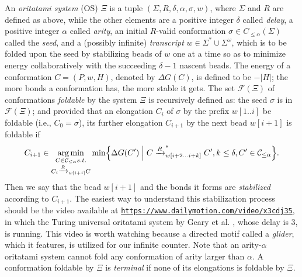 \documentclass[twocolumn]{svjour3}
\DeclareMathOperator*{\argmin}{arg\,min}
\begin{document}
An \textit{oritatami system} (OS) $\Xi$ is a tuple $(\Sigma, R, \delta, \alpha, \sigma, w)$, where $\Sigma$ and $R$ are defined as above, while the other elements are
a positive integer $\delta$ called \textit{delay}, 
a positive integer $\alpha$ called \textit{arity},
an initial $R$-valid conformation $\sigma \in C_{\le \alpha}(\Sigma)$ called the \textit{seed},
and a (possibly infinite) \textit{transcript} $w \in \Sigma^* \cup \Sigma^\omega$, which is to be folded upon the seed by stabilizing beads of $w$ one at a time so as to minimize energy collaboratively with the succeeding $\delta{-}1$ nascent beads.
%
The energy of a conformation $C = (P, w, H)$, denoted by $\Delta G(C)$, is defined to be ${-}|H|$; the more bonds a conformation has, the more stable it gets. 
The set $\mathcal{F}(\Xi)$ of conformations \textit{foldable} by the system $\Xi$ is recursively defined as: the seed $\sigma$ is in $\mathcal{F}(\Xi)$; and provided that an elongation $C_i$ of $\sigma$ by the prefix $w[1..i]$ be foldable (i.e., $C_0 = \sigma$), its further elongation $C_{i+1}$ by the next bead $w[i+1]$ is foldable if 
\begin{equation}\label{eq:OS_CF}
C_{i+1} \in \argmin_{
\substack{
C \in \mathcal{C}_{\le \alpha} s.t. \\
C_i \xrightarrow{R}_{w[i+1]}C \\
}
}
\min \Bigl\{ \Delta G(C') \Bigm|
C \xrightarrow{R}^*_{w[i+2...i+k]}C', k\le \delta, C' \in \mathcal{C}_{\le \alpha}
\Bigr\}.
\end{equation}
%
Then we say that the bead $w[i+1]$ and the bonds it forms are \textit{stabilized} according to $C_{i+1}$. 
The easiest way to understand this stabilization process should be the video available at \href{https://www.dailymotion.com/video/x3cdj35}{\texttt{https://www.dailymotion.com\slash video\slash x3cdj35}}, in which the Turing universal oritatami system by Geary et al. \cite{GeMeScSe2018}, whose delay is 3, is running.
This video is worth watching because a directed motif called a \textit{glider}, which it features, is utilized for our infinite counter.
Note that an arity-$\alpha$ oritatami system cannot fold any conformation of arity larger than $\alpha$. %
A conformation foldable by $\Xi$ is \textit{terminal} if none of its elongations is foldable by $\Xi$. 
\end{document}
